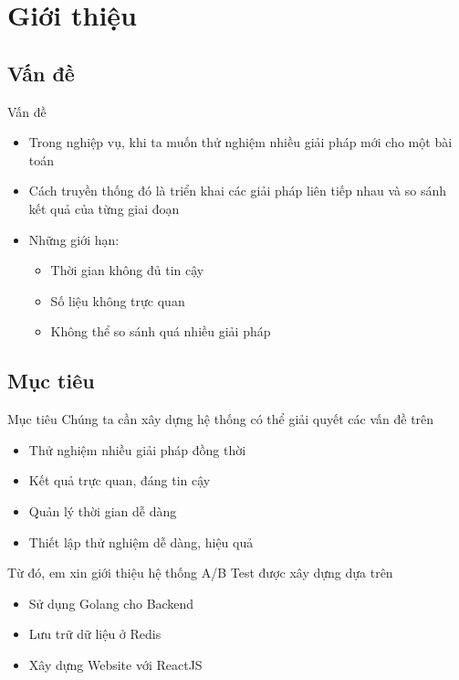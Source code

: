 \section{Giới thiệu}

\subsection{Vấn đề}

\begin{frame}{Vấn đề}
	\begin{itemize}
		\item Trong nghiệp vụ, khi ta muốn thử nghiệm nhiều giải pháp mới cho một bài toán
		\item Cách truyền thống đó là triển khai các giải pháp liên tiếp nhau và so sánh kết quả của từng giai đoạn
		\item Những giới hạn:
		      \begin{itemize}
			      \item Thời gian không đủ tin cậy
			      \item Số liệu không trực quan
			      \item Không thể so sánh quá nhiều giải pháp
		      \end{itemize}
	\end{itemize}
\end{frame}

\subsection{Mục tiêu}

\begin{frame}{Mục tiêu}
	Chúng ta cần xây dựng hệ thống có thể giải quyết các vấn đề trên
	\begin{itemize}
		\item Thử nghiệm nhiều giải pháp đồng thời
		\item Kết quả trực quan, đáng tin cậy
		\item Quản lý thời gian dễ dàng
		\item Thiết lập thử nghiệm dễ dàng, hiệu quả
	\end{itemize}
	Từ đó, em xin giới thiệu hệ thống A/B Test được xây dựng dựa trên
	\begin{itemize}
		\item Sử dụng Golang cho Backend
		\item Lưu trữ dữ liệu ở Redis
		\item Xây dựng Website với ReactJS
	\end{itemize}
\end{frame}
